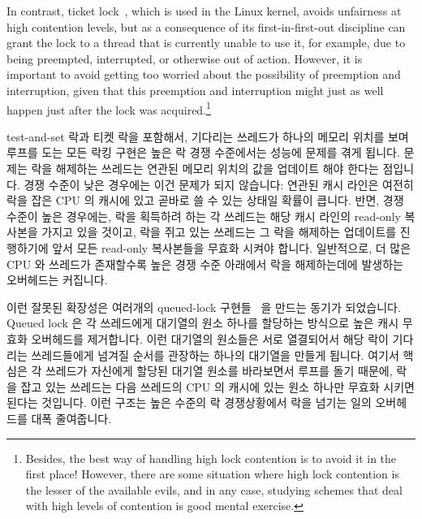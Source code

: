 In contrast, ticket lock~\cite{MellorCrummey91a}, which is used in the Linux
kernel, avoids unfairness at high contention levels, but as a
consequence of its first-in-first-out discipline can grant the
lock to a thread that is currently unable to use it, for example,
due to being preempted, interrupted, or otherwise out of action.
However, it is important to avoid getting too worried about the
possibility of preemption and interruption, given that this preemption
and interruption might just as well happen just after the lock was
acquired.\footnote{
	Besides, the best way of handling high lock contention is to avoid
	it in the first place!
	However, there are some situation where high lock contention
	is the lesser of the available evils, and in any case, studying
	schemes that deal with high levels of contention is good mental
	exercise.}
\fi

test-and-set 락과 티켓 락을 포함해서, 기다리는 쓰레드가 하나의 메모리 위치를
보며 루프를 도는 모든 락킹 구현은 높은 락 경쟁 수준에서는 성능에 문제를 겪게
됩니다.
문제는 락을 해제하는 쓰레드는 연관된 메모리 위치의 값을 업데이트 해야 한다는
점입니다.
경쟁 수준이 낮은 경우에는 이건 문제가 되지 않습니다: 연관된 캐시 라인은 여전히
락을 잡은 CPU 의 캐시에 있고 곧바로 쓸 수 있는 상태일 확률이 큽니다.
반면, 경쟁 수준이 높은 경우에는, 락을 획득하려 하는 각 쓰레드는 해당 캐시
라인의 read-only 복사본을 가지고 있을 것이고, 락을 쥐고 있는 쓰레드는 그 락을
해제하는 업데이트를 진행하기에 앞서 모든 read-only 복사본들을 무효화 시켜야
합니다.
일반적으로, 더 많은 CPU 와 쓰레드가 존재할수록 높은 경쟁 수준 아래에서 락을
해제하는데에 발생하는 오버헤드는 커집니다.

이런 잘못된 확장성은 여러개의 queued-lock
구현들~\cite{Anderson90,Graunke90,MellorCrummey91a,Wisniewski94,Craig93,Magnusson94,Takada93}
을 만드는 동기가 되었습니다.
Queued lock 은 각 쓰레드에게 대기열의 원소 하나를 할당하는 방식으로 높은 캐시
무효화 오버헤드를 제거합니다.
이런 대기열의 원소들은 서로 열결되어서 해당 락이 기다리는 쓰레드들에게 넘겨질
순서를 관장하는 하나의 대기열을 만들게 됩니다.
여기서 핵심은 각 쓰레드가 자신에게 할당된 대기열 원소를 바라보면서 루프를 돌기
때문에, 락을 잡고 있는 쓰레드는 다음 쓰레드의 CPU 의 캐시에 있는 원소 하나만
무효화 시키면 된다는 것입니다.
이런 구조는 높은 수준의 락 경쟁상황에서 락을 넘기는 일의 오버헤드를 대폭
줄여줍니다.
\iffalse

